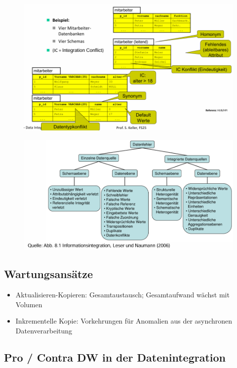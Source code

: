 \documentclass[../Main.tex]{subfiles}
\begin{document}
\begin{figure}[H]
    \centering
    \includegraphics[width=1\linewidth]{Images/datan/datenintegration-example.png}
\end{figure}
\begin{figure}[H]
    \centering
    \includegraphics[width=1\linewidth]{Images/datan/datenintegration-fehler.png}
\end{figure}

\subsection{Wartungsansätze}
\begin{itemize}
    \item Aktualisieren-Kopieren: Gesamtaustausch; Gesamtaufwand wächst mit Volumen
    \item Inkrementelle Kopie: Vorkehrungen für Anomalien aus der asynchronen Datenverarbeitung
\end{itemize}

\subsection{Pro / Contra DW in der Datenintegration}
\end{document}
